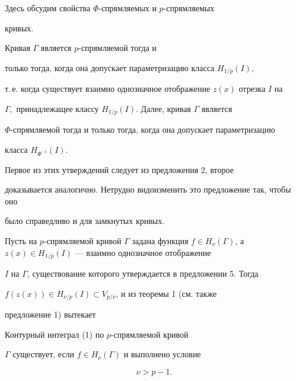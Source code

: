 Здесь обсудим свойства $\Phi$-спрямляемых и $p$-спрямляемых


кривых.





\begin{prop}


Кривая $\Gamma$ является $p$-спрямляемой тогда и


только тогда, когда она допускает параметризацию класса $H_{1/p}(I),$


т.\,е. когда существует взаимно однозначное отображение $z(x)$ отрезка $I$ на


$\Gamma,$ принадлежащее классу $H_{1/p}(I).$ Далее, кривая $\Gamma$ является


$\Phi$-спрямляемой тогда и только тогда, когда она допускает параметризацию


класса $H_{\Phi^{-1}}(I)$.


\end{prop}





Первое из этих утверждений следует из предложения 2, второе


доказывается аналогично. Нетрудно видоизменить это предложение так, чтобы оно


было справедливо и для замкнутых кривых.





Пусть на $p$-спрямляемой кривой $\Gamma$ задана функция $f\in


H_{\nu}(\Gamma)$, а $z(x)\in H_{1/p}(I)$ --- взаимно однозначное отображение


$I$ на $\Gamma$, существование которого утверждается в предложении 5. Тогда


$f(z(x))\in H_{\nu/p}(I)\subset V_{p/\nu}$, и из теоремы 1 (см. также


предложение 1) вытекает





\begin{cor}


Контурный интеграл (1) по $p$-спрямляемой кривой


$\Gamma$ существует, если $f\in H_{\nu}(\Gamma)$ и выполнено условие


\begin{equation}


\nu > p - 1.


\end{equation}


\end{cor}






